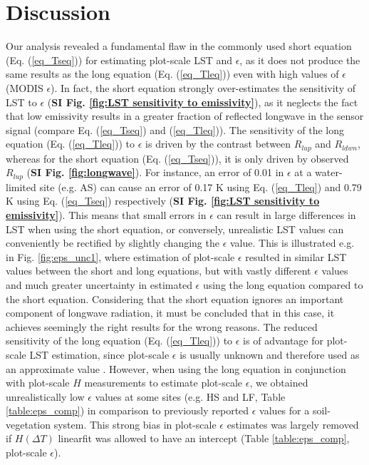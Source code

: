 \documentclass[fleqn,10pt]{wlscirep}
\begin{document}
{{\section{Discussion}
Our analysis revealed a fundamental flaw in the commonly used short equation (Eq. (\ref{eq_Tseq})) for estimating plot-scale LST and $\epsilon$, as it does not produce the same results as the long equation (Eq. (\ref{eq_Tleq})) even with high values of $\epsilon$ (MODIS $\epsilon$). In fact, the short equation strongly over-estimates the sensitivity of LST to $\epsilon$ (\textbf{SI Fig. \ref{fig:LST sensitivity to emissivity}}), as it neglects the fact that low emissivity results in a greater fraction of reflected longwave in the sensor signal (compare Eq. (\ref{eq_Tseq}) and (\ref{eq_Tleq})). The sensitivity of the long equation (Eq. (\ref{eq_Tleq})) to $\epsilon$ is driven by the contrast between $R_{lup}$ and $R_{ldwn}$, whereas for the short equation (Eq. (\ref{eq_Tseq})), it is only driven by observed $R_{lup}$ (\textbf{SI Fig. \ref{fig:longwave}}). For instance, an error of 0.01 in $\epsilon$ at a water-limited site (e.g. AS) can cause an error of 0.17 K using Eq. (\ref{eq_Tleq}) and 0.79 K using Eq. (\ref{eq_Tseq}) respectively (\textbf{SI Fig. \ref{fig:LST sensitivity to emissivity}}). This means that small errors in $\epsilon$ can result in large differences in LST when using the short equation, or conversely, unrealistic LST values can conveniently be rectified by slightly changing the $\epsilon$ value. This is illustrated e.g. in Fig. \ref{fig:eps_unc1}, where estimation of plot-scale $\epsilon$ resulted in similar LST values between the short and long equations, but with vastly different $\epsilon$ values and much greater uncertainty in estimated $\epsilon$ using the long equation compared to the short equation. Considering that the short equation ignores an important component of longwave radiation, it must be concluded that in this case, it achieves seemingly the right results for the wrong reasons. The reduced sensitivity of the long equation (Eq. (\ref{eq_Tleq})) to $\epsilon$ is of advantage for plot-scale LST estimation, since plot-scale $\epsilon$ is usually unknown and therefore used as an approximate value \cite{mallick2018bridging}. However, when using the long equation in conjunction with plot-scale $H$ measurements to estimate plot-scale $\epsilon$, we obtained unrealistically low $\epsilon$ values at some sites (e.g. HS and LF, Table \ref{table:eps_comp}) in comparison to previously reported  $\epsilon$ values for a soil-vegetation system\cite{sugita1996optimal,snyder1998classification}. This strong bias in plot-scale $\epsilon$ estimates was largely removed if  $H(\Delta T)$ linearfit was allowed to have an intercept (Table \ref{table:eps_comp}, plot-scale $\epsilon$). 
}}
\end{document}
